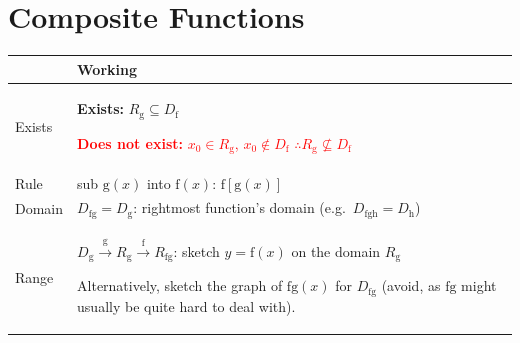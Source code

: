 \documentclass[a4paper,11pt,oneside]{book}
\begin{document}
\section{Composite Functions}
{\renewcommand{\arraystretch}{1.35}\centering\begin{tabular}{|>{\raggedright\arraybackslash}m{2.4cm}|>{\raggedright\arraybackslash}m{12.4cm}|}\hline
 & \textbf{Working}\\\hline
Exists & \textbf{Exists:} $R_{\mathrm{g}}\subseteq D_{\mathrm{f}}$\par \textcolor{red}{\textbf{Does not exist:} $x_0\in R_{\mathrm{g}}$, $x_0\notin D_{\mathrm{f}}$ $\therefore R_{\mathrm{g}}\not\subseteq D_{\mathrm{f}}$}\\\hline
Rule & sub $\mathrm{g}(x)$ into $\mathrm{f}(x)$: $\mathrm{f}[\mathrm{g}(x)]$\\\hline
Domain & $D_{\mathrm{f}\mathrm{g}}=D_{\mathrm{g}}$: rightmost function's domain (e.g.\ $D_{\mathrm{fgh}}=D_{\mathrm{h}}$)\\\hline
Range & $D_{\mathrm{g}}\xrightarrow{\ \mathrm{g}\ }R_{\mathrm{g}}\xrightarrow{\ \mathrm{f}\ }R_{\mathrm{f}\mathrm{g}}$: sketch $y=\mathrm{f}(x)$ on the domain $R_{\mathrm{g}}$\par \textcolor{black!35}{Alternatively, sketch the graph of $\mathrm{fg}(x)$ for $D_{\mathrm{fg}}$ (avoid, as $\mathrm{fg}$ might usually be quite hard to deal with).}\\\hline
\end{tabular}\par}\medskip
\end{document}
